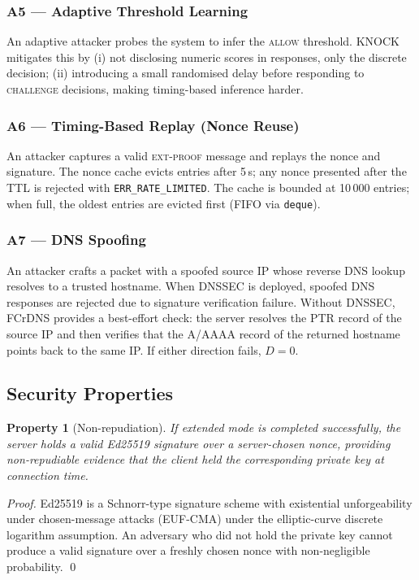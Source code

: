 \documentclass[10pt,conference]{IEEEtran}
\newtheorem{property}{Property}
\begin{document}
\subsubsection{A5 — Adaptive Threshold Learning}

An adaptive attacker probes the system to infer the \textsc{allow}
threshold.  KNOCK mitigates this by (i) not disclosing numeric scores
in responses, only the discrete decision; (ii) introducing a small
randomised delay before responding to \textsc{challenge} decisions,
making timing-based inference harder.

\subsubsection{A6 — Timing-Based Replay (Nonce Reuse)}

An attacker captures a valid \textsc{ext-proof} message and replays
the nonce and signature.  The nonce cache evicts entries after 5\,s;
any nonce presented after the TTL is rejected with
\texttt{ERR\_RATE\_LIMITED}.  The cache is bounded at 10\,000 entries;
when full, the oldest entries are evicted first (FIFO via
\texttt{deque}).

\subsubsection{A7 — DNS Spoofing}

An attacker crafts a packet with a spoofed source IP whose reverse DNS
lookup resolves to a trusted hostname.  When DNSSEC is deployed,
spoofed DNS responses are rejected due to signature verification
failure.  Without DNSSEC, FCrDNS provides a best-effort check: the
server resolves the PTR record of the source IP and then verifies that
the A/AAAA record of the returned hostname points back to the same IP.
If either direction fails, $D = 0$.

\subsection{Security Properties}

\begin{property}[Non-repudiation]
  If extended mode is completed successfully, the server holds a
  valid Ed25519 signature over a server-chosen nonce, providing
  non-repudiable evidence that the client held the corresponding
  private key at connection time.
\end{property}

\begin{proof}
  Ed25519 is a Schnorr-type signature scheme with existential
  unforgeability under chosen-message attacks (EUF-CMA)
  under the elliptic-curve discrete logarithm assumption.
  An adversary who did not hold the private key cannot produce a valid
  signature over a freshly chosen nonce with non-negligible probability.
  \qed
\end{proof}
\end{document}
